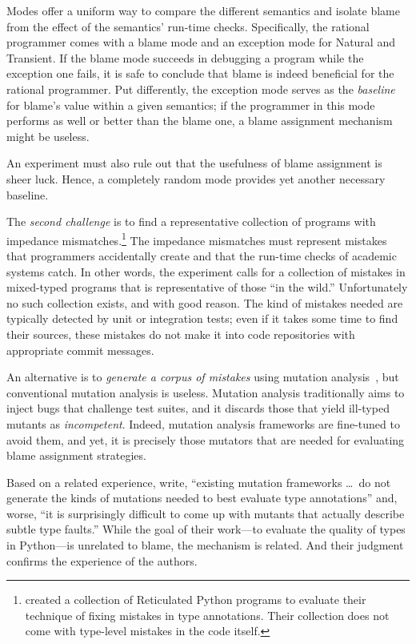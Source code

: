 Modes offer a uniform way to compare the different semantics and isolate blame
from the effect of the semantics' run-time checks. Specifically, the rational
programmer comes with a blame mode and an exception mode for Natural and
Transient. If the blame mode succeeds in debugging a program while the exception
one fails, it is safe to conclude that blame is indeed beneficial for the
rational programmer. Put differently, the exception mode serves as the {\em
baseline\/} for blame's value within a given semantics; if the programmer in
this mode performs as well or better than the blame one, a blame assignment
mechanism might be useless.

An experiment must also rule out that the usefulness of blame assignment is sheer
luck.  Hence, a completely random mode provides yet another necessary baseline.

The {\em second challenge\/} is to find a representative collection of programs
with impedance mismatches.\footnote{\citet{cc-oopsla-20} created a collection of
Reticulated Python programs to evaluate their technique of fixing mistakes in
type annotations. Their collection does not come with type-level mistakes in the
code itself.}  The impedance mismatches must represent mistakes that programmers accidentally
create and that the run-time checks of academic systems catch. In other words,
the experiment calls for a collection of mistakes in mixed-typed programs that is
representative of those ``in the wild.''  Unfortunately no such collection
exists, and with good reason. The kind of mistakes needed are typically detected
by unit or integration tests; even if it takes some time to find their sources,
these mistakes do not make it into code repositories with appropriate commit
messages.

An alternative is to {\em generate a corpus of 
mistakes \/} using mutation analysis~\citep{lipton1971fault, demillo1978hints,
jia2011analysis}, but conventional mutation analysis is useless.  Mutation
analysis traditionally aims to inject bugs that challenge test suites, and it
discards those that yield ill-typed mutants as \emph{incompetent}. Indeed,
mutation analysis frameworks are fine-tuned to avoid them, and yet, it is
precisely those mutators that are needed for evaluating blame assignment strategies.

Based on a related experience, \citet{gw-mutation} write,
``existing mutation frameworks \ldots\ do not generate the kinds of mutations
needed to best evaluate type annotations'' and, worse, ``it is surprisingly
difficult to come up with mutants that actually describe subtle type faults.''
While the goal of their work---to evaluate the quality of types in
Python---is unrelated to blame, the mechanism is related. And their
judgment confirms the experience of the authors. 

